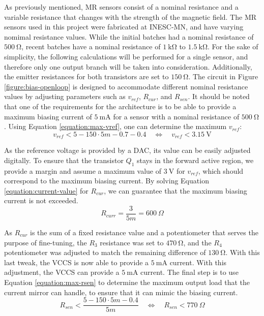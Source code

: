 As previously mentioned, \ac{MR} sensors consist of a nominal resistance and a variable resistance that changes with the strength of the magnetic field. The \ac{MR} sensors used in this project were fabricated at \ac{INESC-MN}, and have varying nomimal resistance values. While the initial batches had a nominal resistance of $\mathrm{500~\Omega}$, recent batches have a nominal resistance of $\mathrm{1~k\Omega}$ to $\mathrm{1.5~k\Omega}$. For the sake of simplicity, the following calculations will be performed for a single sensor, and therefore only one output branch will be taken into consideration. Additionally, the emitter resistances for both transistors are set to $\mathrm{150~\Omega}$. The circuit in Figure \ref{figure:bias-openloop} is designed to accommodate different nominal resistance values by adjusting parameters such as $v_{ref}$, $R_{cur}$, and $R_{sen}$. It should be noted that one of the requirements for the architecture is to be able to provide a maximum biasing current of $\mathrm{5~mA}$ for a sensor with a nominal resistance of $\mathrm{500~\Omega}$. Using Equation \ref{equation:max-vref}, one can determine the maximum $v_{ref}$:
\begin{equation}
    \nonumber v_{ref} < 5 - 150 \cdot 5m - 0.7 - 0.4 \quad \Leftrightarrow
    \quad v_{ref} < 3.15~\mathrm{V}
\end{equation}

\noindent
As the reference voltage is provided by a \ac{DAC}, its value can be easily adjusted digitally. To ensure that the transistor $Q_1$ stays in the forward active region, we provide a margin and assume a maximum value of $\mathrm{3~V}$ for $v_{ref}$, which should correspond to the maximum biasing current. By solving Equation \ref{equation:current-value} for $R_{cur}$, we can guarantee that the maximum biasing current is not exceeded.
\begin{equation}
    \nonumber R_{curr} = \frac{3}{5m} = 600~\Omega
\end{equation}

\noindent
As $R_{cur}$ is the sum of a fixed resistance value and a potentiometer that serves the purpose of fine-tuning, the $R_3$ resistance was set to $\mathrm{470~\Omega}$, and the $R_4$ potentiometer was adjusted to match the remaining difference of $\mathrm{130~\Omega}$. With this last tweak, the \ac{VCCS} is now able to provide a $\mathrm{5~mA}$ current. With this adjustment, the \ac{VCCS} can provide a $\mathrm{5~mA}$ current. The final step is to use Equation \ref{equation:max-rsen} to determine the maximum output load that the current mirror can handle, to ensure that it can mimic the biasing current.
\begin{equation}
    \nonumber R_{sen} < \frac{ 5 - 150 \cdot 5m - 0.4 }{ 5m } \quad \Leftrightarrow 
    \quad R_{sen} < 770~\Omega
\end{equation}

